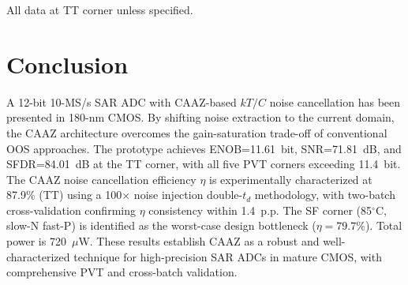 \documentclass[journal]{IEEEtran}
\begin{document}
\begin{table}[htbp]
\centering
\caption{Performance Comparison}
\label{tab:comp}
\small
{}
\par\footnotesize{All data at TT corner unless specified.}
\end{table}

\section{Conclusion}

A 12-bit 10-MS/s SAR ADC with CAAZ-based $kT/C$ noise cancellation has been presented in 180-nm CMOS. By shifting noise extraction to the current domain, the CAAZ architecture overcomes the gain-saturation trade-off of conventional OOS approaches. The prototype achieves ENOB=11.61~bit, SNR=71.81~dB, and SFDR=84.01~dB at the TT corner, with all five PVT corners exceeding 11.4~bit. The CAAZ noise cancellation efficiency $\eta$ is experimentally characterized at 87.9\% (TT) using a 100$\times$ noise injection double-$t_d$ methodology, with two-batch cross-validation confirming $\eta$ consistency within 1.4~p.p. The SF corner (85$^\circ$C, slow-N fast-P) is identified as the worst-case design bottleneck ($\eta=79.7\%$). Total power is 720~$\mu$W. These results establish CAAZ as a robust and well-characterized technique for high-precision SAR ADCs in mature CMOS, with comprehensive PVT and cross-batch validation.
\end{document}
